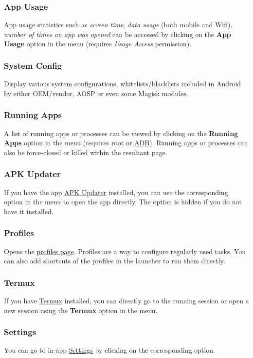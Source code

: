 \subsubsection{App Usage}
App usage statistics such as \textit{screen time}, \textit{data usage} (both mobile and Wifi), \textit{number of times
an app was opened} can be accessed by clicking on the \textbf{App Usage} option in the menu (requires \textit{Usage
Access} permission).

\subsubsection{System Config}
Display various system configurations, whitelists/blacklists included in Android by either OEM/vendor, AOSP or even some
Magisk modules.

\subsubsection{Running Apps}\label{subsubsec:main:running-apps}
A list of running apps or processes can be viewed by clicking on the \textbf{Running Apps} option in the menu (requires
root or \hyperref[sec:adb-over-tcp]{ADB}). Running apps or processes can also be force-closed or killed within the
resultant page.

\subsubsection{APK Updater}
If you have the app \href{https://github.com/rumboalla/apkupdater}{APK Updater} installed, you can use the corresponding
option in the menu to open the app directly. The option is hidden if you do not have it installed.

\subsubsection{Profiles}
Opens the \hyperref[sec:profiles-page]{profiles page}. Profiles are a way to configure regularly used tasks. You can
also add shortcuts of the profiles in the launcher to run them directly.

\subsubsection{Termux}
If you have \href{https://github.com/termux/termux-app}{Termux} installed, you can directly go to the running session
or open a new session using the \textbf{Termux} option in the menu.

\subsubsection{Settings}
You can go to in-app \hyperref[sec:settings-page]{Settings} by clicking on the corresponding option.
